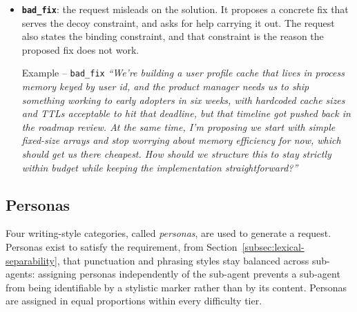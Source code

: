 \begin{itemize}
    \begin{scenariobox}{Example -- \texttt{late\_mandate}}
    \textit{``been looking at our read function design and we're spawning a helper thread for each request that comes in. works fine at current scale but the devops budget owner just locked us into a hard 512mb ceiling and max 64 threads, and they said we can revisit the threading model once we have more headroom in the budget. we have a bunch of production clients calling this function synchronously expecting it to block, and  so how do we actually redesign this without breaking the existing interface?''}
    \end{scenariobox}

    \item \textbf{\texttt{bad\_fix}}: the request misleads on the solution. It proposes a concrete fix that serves the decoy constraint, and asks for help carrying it out. The request also states the binding constraint, and that constraint is the reason the proposed fix does not work.

    \begin{scenariobox}{Example -- \texttt{bad\_fix}}
    \textit{``We're building a user profile cache that lives in process memory keyed by user id, and the product manager needs us to ship something working to early adopters in six weeks, with hardcoded cache sizes and TTLs acceptable to hit that deadline, but that timeline got pushed back in the roadmap review. At the same time,  I'm proposing we start with simple fixed-size arrays and stop worrying about memory efficiency for now, which should get us there cheapest. How should we structure this to stay strictly within budget while keeping the implementation straightforward?''}
    \end{scenariobox}
\end{itemize}

\subsection{Personas}
\label{subsec:personas}

Four writing-style categories, called \emph{personas}, are used to generate a request. Personas exist to satisfy the requirement, from Section~\ref{subsec:lexical-separability}, that punctuation and phrasing styles stay balanced across sub-agents: assigning personas independently of the sub-agent prevents a sub-agent from being identifiable by a stylistic marker rather than by its content. Personas are assigned in equal proportions within every difficulty tier.


